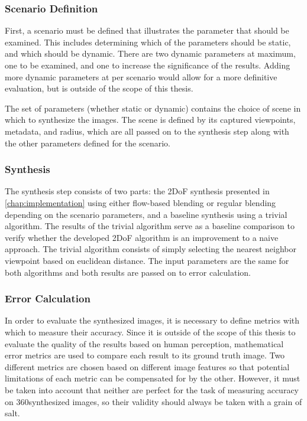 \subsubsection{Scenario Definition}
First, a scenario must be defined that illustrates the parameter that should be examined. This includes determining which of the parameters should be static, and which should be dynamic. There are two dynamic parameters at maximum, one to be examined, and one to increase the significance of the results. Adding more dynamic parameters at per scenario would allow for a more definitive evaluation, but is outside of the scope of this thesis.

The set of parameters (whether static or dynamic) contains the choice of scene in which to synthesize the images. The scene is defined by its captured viewpoints, metadata, and radius, which are all passed on to the synthesis step along with the other parameters defined for the scenario.

\subsubsection{Synthesis}
The synthesis step consists of two parts: the 2DoF synthesis presented in \ref{chap:implementation} using either flow-based blending or regular blending depending on the scenario parameters, and a baseline synthesis using a trivial algorithm. The results of the trivial algorithm serve as a baseline comparison to verify whether the developed 2DoF algorithm is an improvement to a naive approach. The trivial algorithm consists of simply selecting the nearest neighbor viewpoint based on euclidean distance. The input parameters are the same for both algorithms and both results are passed on to error calculation.

\subsubsection{Error Calculation}
In order to evaluate the synthesized images, it is necessary to define metrics with which to measure their accuracy. Since it is outside of the scope of this thesis to evaluate the quality of the results based on human perception, mathematical error metrics are used to compare each result to its ground truth image. Two different metrics are chosen based on different image features so that potential limitations of each metric can be compensated for by the other. However, it must be taken into account that neither are perfect for the task of measuring accuracy on 360\degree synthesized images, so their validity should always be taken with a grain of salt. 

